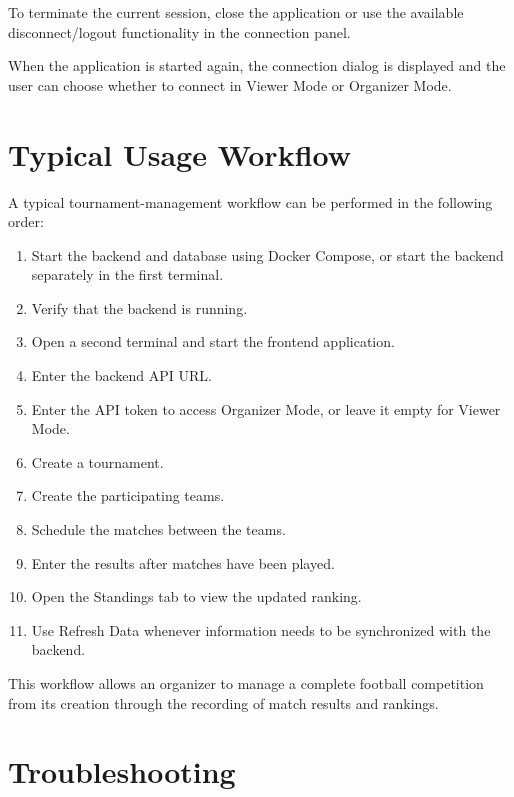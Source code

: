 \documentclass[12pt,a4paper]{article}
\begin{document}
To terminate the current session, close the application or use
the available disconnect/logout functionality in the connection
panel.

When the application is started again, the connection dialog is
displayed and the user can choose whether to connect in Viewer
Mode or Organizer Mode.


\section{Typical Usage Workflow}

A typical tournament-management workflow can be performed in the
following order:

\begin{enumerate}
\item Start the backend and database using Docker Compose,
or start the backend separately in the first terminal.
\item Verify that the backend is running.
\item Open a second terminal and start the frontend
application.
\item Enter the backend API URL.
\item Enter the API token to access Organizer Mode, or leave
it empty for Viewer Mode.
\item Create a tournament.
\item Create the participating teams.
\item Schedule the matches between the teams.
\item Enter the results after matches have been played.
\item Open the Standings tab to view the updated ranking.
\item Use Refresh Data whenever information needs to be
synchronized with the backend.
\end{enumerate}

This workflow allows an organizer to manage a complete football
competition from its creation through the recording of match
results and rankings.


\section{Troubleshooting}
\end{document}
